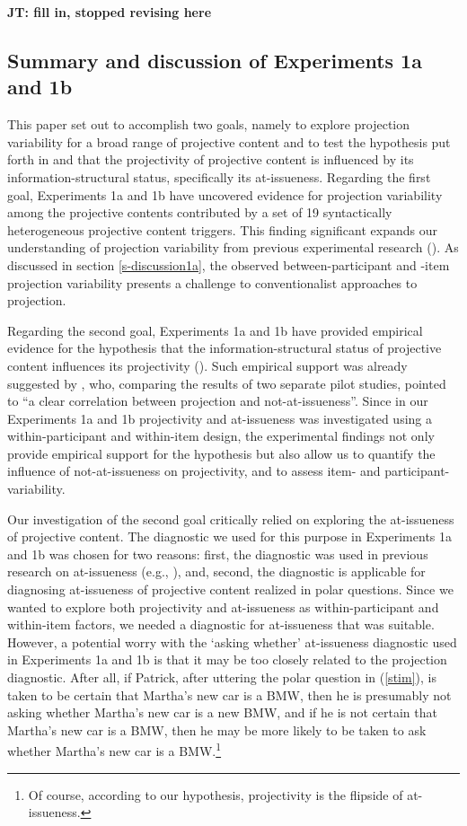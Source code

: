 \documentclass[11pt,fleqn]{article}
\newcommand{\6}{\mbox{$[\hspace*{-.6mm}[$}}
\newcommand{\9}{\mbox{$]\hspace*{-.6mm}]$}}
\newcommand{\jt}[1]{\textbf{\color{blue}JT: #1}}
\begin{document}
\jt{fill in, stopped revising here}

\subsection{Summary and discussion of Experiments 1a and 1b}

This paper set out to accomplish two goals, namely to explore projection variability for a broad range of projective content and to test the hypothesis put forth in \citealt{brst-salt10} and \citealt{brst-ar} that the projectivity of projective content is influenced by its information-structural status, specifically its at-issueness. Regarding the first goal, Experiments 1a and 1b have uncovered evidence for projection variability among the projective contents contributed by a set of 19 syntactically heterogeneous projective content triggers. This finding significant expands our understanding of projection variability from previous experimental research (\citealt{xue-onea11,smith-hall11}). As discussed in section \ref{s-discussion1a}, the observed between-participant and -item projection variability presents a challenge to conventionalist approaches to projection. 

Regarding the second goal, Experiments 1a and 1b have provided empirical evidence for the hypothesis that the information-structural status of projective content influences its projectivity (\citealt{brst-salt10,brst-ar}). Such empirical support was already suggested by \citet[180]{xue-onea11}, who, comparing the results of two separate pilot studies, pointed to ``a clear correlation between projection and not-at-issueness''. Since in our Experiments 1a and 1b projectivity and at-issueness was investigated using a within-participant and within-item design, the experimental findings not only provide empirical support for the hypothesis but also allow us to quantify the influence of not-at-issueness on projectivity, and to assess item- and participant-variability.

Our investigation of the second goal critically relied on exploring the at-issueness of projective content. The diagnostic we used for this purpose in Experiments 1a and 1b was chosen for two reasons: first, the diagnostic was used in previous research on at-issueness (e.g., \citealt{amaral-etal07,tonhauser-sula6}), and, second, the diagnostic is applicable for diagnosing at-issueness of projective content realized in polar questions. Since we wanted to explore both projectivity and at-issueness as within-participant and within-item factors, we needed a diagnostic for at-issueness that was suitable. However, a potential worry with the `asking whether' at-issueness diagnostic used in Experiments 1a and 1b is that it may be too closely related to the projection diagnostic. After all, if Patrick, after uttering the polar question in (\ref{stim}), is taken to be certain that Martha's new car is a BMW, then he is presumably not asking whether Martha's new car is a new BMW, and if he is not certain that Martha's new car is a BMW, then he may be more likely to be taken to ask whether Martha's new car is a BMW.\footnote{Of course, according to our hypothesis, projectivity is the flipside of at-issueness.}
\end{document}
